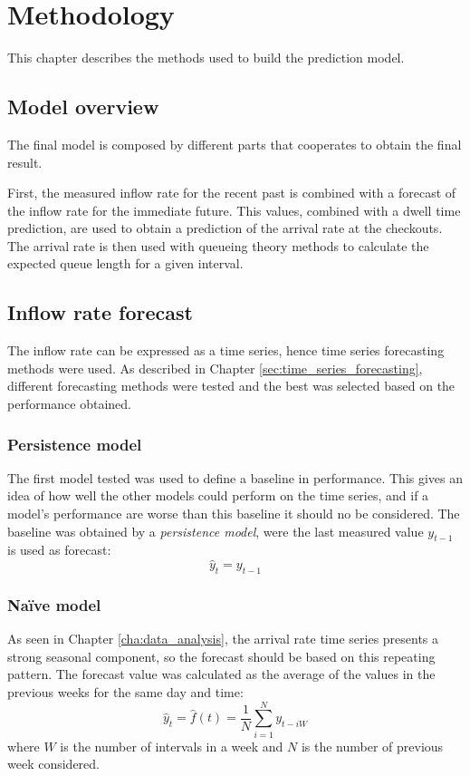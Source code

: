 \chapter{Methodology}
\label{cha:methodology}

This chapter describes the methods used to build the prediction model.

\section{Model overview}
The final model is composed by different parts that cooperates to obtain the final result.

First, the measured inflow rate for the recent past is combined with a forecast of the inflow rate for the immediate future. This values, combined with a dwell time prediction, are used to obtain a prediction of the arrival rate at the checkouts. The arrival rate is then used with queueing theory methods to calculate the expected queue length for a given interval.

\section{Inflow rate forecast}
\label{sec:inflow_rate_forecast}

The inflow rate can be expressed as a time series, hence time series forecasting methods were used. As described in Chapter \ref{sec:time_series_forecasting}, different forecasting methods were tested and the best was selected based on the performance obtained.

\subsection{Persistence model}
\label{subsec:persistence_model}
The first model tested was used to define a baseline in performance. This gives an idea of how well the other models could perform on the time series, and if a model’s performance are worse than this baseline it should no be considered. The baseline was obtained by a \emph{persistence model}, were the last measured value \(y_{t-1}\) is used as forecast:
\[ \hat{y}_t = y_{t-1} \]

\subsection{Naïve model}
\label{subsec:naive_model}
As seen in Chapter \ref{cha:data_analysis}, the arrival rate time series presents a strong seasonal component, so the forecast should be based on this repeating pattern. The forecast value was calculated as the average of the values in the previous weeks for the same day and time:
\[ \hat{y}_t = \hat{f}(t) = \frac{1}{N} \sum_{i=1}^{N} y_{t-iW} \]
where \(W\) is the number of intervals in a week and \(N\) is the number of previous week considered.

